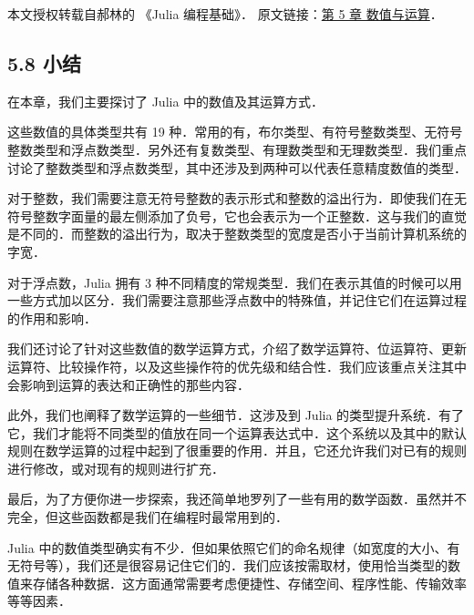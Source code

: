 
本文授权转载自郝林的 《Julia 编程基础》． 原文链接：\href{https://github.com/hyper0x/JuliaBasics/blob/master/book/ch05.md}{第 5 章 数值与运算}．


\subsection{5.8 小结}

在本章，我们主要探讨了 Julia 中的数值及其运算方式．

这些数值的具体类型共有 19 种．常用的有，布尔类型、有符号整数类型、无符号整数类型和浮点数类型．另外还有复数类型、有理数类型和无理数类型．我们重点讨论了整数类型和浮点数类型，其中还涉及到两种可以代表任意精度数值的类型．

对于整数，我们需要注意无符号整数的表示形式和整数的溢出行为．即使我们在无符号整数字面量的最左侧添加了负号，它也会表示为一个正整数．这与我们的直觉是不同的．而整数的溢出行为，取决于整数类型的宽度是否小于当前计算机系统的字宽．

对于浮点数，Julia 拥有 3 种不同精度的常规类型．我们在表示其值的时候可以用一些方式加以区分．我们需要注意那些浮点数中的特殊值，并记住它们在运算过程的作用和影响．

我们还讨论了针对这些数值的数学运算方式，介绍了数学运算符、位运算符、更新运算符、比较操作符，以及这些操作符的优先级和结合性．我们应该重点关注其中会影响到运算的表达和正确性的那些内容．

此外，我们也阐释了数学运算的一些细节．这涉及到 Julia 的类型提升系统．有了它，我们才能将不同类型的值放在同一个运算表达式中．这个系统以及其中的默认规则在数学运算的过程中起到了很重要的作用．并且，它还允许我们对已有的规则进行修改，或对现有的规则进行扩充．

最后，为了方便你进一步探索，我还简单地罗列了一些有用的数学函数．虽然并不完全，但这些函数都是我们在编程时最常用到的．

Julia 中的数值类型确实有不少．但如果依照它们的命名规律（如宽度的大小、有无符号等），我们还是很容易记住它们的．我们应该按需取材，使用恰当类型的数值来存储各种数据．这方面通常需要考虑便捷性、存储空间、程序性能、传输效率等等因素．